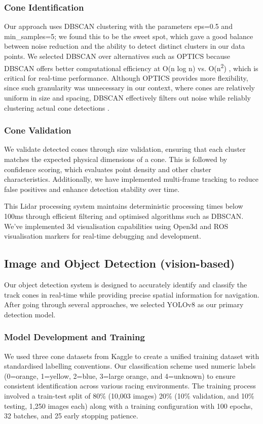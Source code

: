\documentclass[conference]{IEEEtran}
\begin{document}
\subsubsection{Cone Identification}

Our approach uses DBSCAN clustering with the parameters eps=0.5 and min\_samples=5; we found this to be the sweet spot, which gave a good balance between noise reduction and the ability to detect distinct clusters in our data points. We selected DBSCAN over alternatives such as OPTICS because DBSCAN offers better computational efficiency at O(n log n) vs. O(n\textsuperscript{2}) \cite{b2}, which is critical for real-time performance. Although OPTICS provides more flexibility, since such granularity was unnecessary in our context, where cones are relatively uniform in size and spacing, DBSCAN effectively filters out noise while reliably clustering actual cone detections \cite{b1}.
\vspace{0.2em}
\subsubsection{Cone Validation}
We validate detected cones through size validation, ensuring that each cluster matches the expected physical dimensions of a cone. This is followed by confidence scoring, which evaluates point density and other cluster characteristics. Additionally, we have implemented multi-frame tracking to reduce false positives and enhance detection stability over time.

\vspace{0.4em}
This Lidar processing system maintains deterministic processing times below 100ms through efficient filtering and optimised algorithms such as DBSCAN. We've implemented 3d visualisation capabilities using Open3d and ROS visualisation markers for real-time debugging and development.

\subsection{Image and Object Detection (vision-based)}
Our object detection system is designed to accurately identify and classify the track cones in real-time while providing precise spatial information for navigation. After going through several approaches, we selected YOLOv8 as our primary detection model.

\subsubsection{Model Development and Training}
We used three cone datasets from Kaggle to create a unified training dataset with standardised labelling conventions. Our classification scheme used numeric labels (0=orange, 1=yellow, 2=blue, 3=large orange, and 4=unknown) to ensure consistent identification across various racing environments. The training process involved a train-test split of 80\% (10,003 images) 20\% (10\% validation, and 10\% testing, 1,250 images each) along with a training configuration with 100 epochs, 32 batches, and 25 early stopping patience. 
\end{document}
